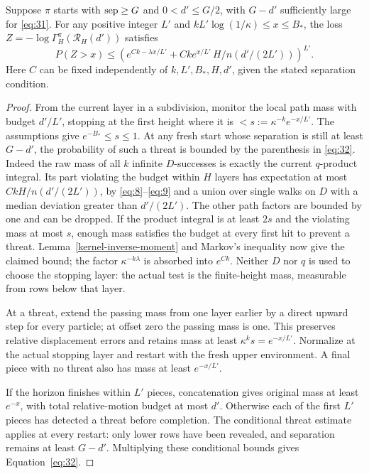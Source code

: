 \begin{proposition}\label{kernel-rapid-loss}
Suppose \(\pi\) starts with \({\rm sep}\ge G\) and \(0<d'\le G/2\), with \(G-d'\) sufficiently large for \eqref{eq:31}. For any positive integer \(L'\) and \(kL'\log(1/\kappa)\le x\le B_*\), the loss \(Z=-\log\Gamma_H^\pi(\mathcal R_H(d'))\) satisfies
\[
P(Z>x)\le
\left(e^{Ck-\lambda x/L'} + C k e^{x/L'}\,H/n(d'/(2L'))\right)^{L'}.
\tag{32}\label{eq:32}
\]
Here \(C\) can be fixed independently of \(k,L',B_*,H,d'\), given the
stated separation condition.
\end{proposition}

\begin{proof}
From the current layer in a subdivision, monitor the local path mass
with budget \(d'/L'\), stopping at the first height where it is
\(<s:=\kappa^{-k}e^{-x/L'}\). The assumptions give
\(e^{-B_*}\le s\le1\). At any fresh start whose separation is still
at least \(G-d'\), the probability of such a threat is bounded by the
parenthesis in \eqref{eq:32}. Indeed the raw mass of all \(k\) infinite
\(D\)-successes is exactly the current \(q\)-product integral. Its
part violating the budget within \(H\) layers has expectation at most
\(CkH/n(d'/(2L'))\), by \eqref{eq:8}--\eqref{eq:9} and a union over
single walks on \(D\) with a median deviation greater than
\(d'/(2L')\). The other path factors are bounded by one and can be
dropped. If the product integral is at least \(2s\) and the violating
mass at most \(s\), enough mass satisfies the budget at every first
hit to prevent a threat. Lemma~\ref{kernel-inverse-moment} and Markov's
inequality now give the claimed bound; the factor
\(\kappa^{-k\lambda}\) is absorbed into \(e^{Ck}\). Neither \(D\) nor
\(q\) is used to choose the stopping layer: the actual test is the
finite-height mass, measurable from rows below that layer.

At a threat, extend the passing mass from one layer earlier by a direct
upward step for every particle; at offset zero the passing mass is one.
This preserves relative displacement errors and retains mass at least
\(\kappa^ks=e^{-x/L'}\). Normalize at the actual stopping layer and
restart with the fresh upper environment. A final piece with no threat
also has mass at least \(e^{-x/L'}\).

If the horizon finishes within \(L'\) pieces, concatenation gives
original mass at least \(e^{-x}\), with total relative-motion budget
at most \(d'\). Otherwise each of the first \(L'\) pieces has
detected a threat before completion. The conditional threat estimate
applies at every restart: only lower rows have been revealed, and
separation remains at least \(G-d'\). Multiplying these conditional
bounds gives Equation~\eqref{eq:32}.
\end{proof}

